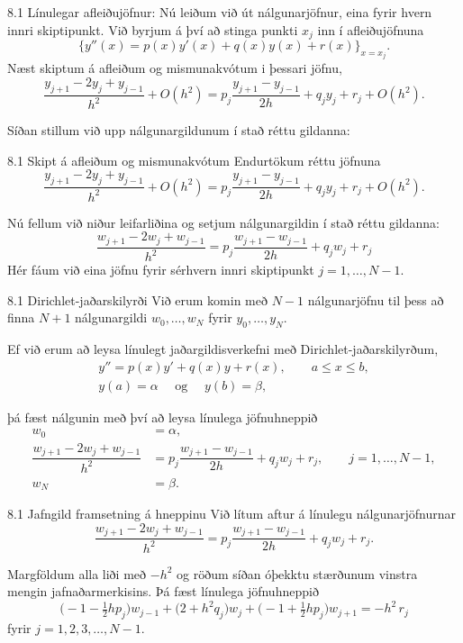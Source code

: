 \begin{frame}{8.1 Línulegar afleiðujöfnur:} 
Nú leiðum við út nálgunarjöfnur, eina fyrir hvern innri skiptipunkt.
Við byrjum á því að stinga punkti $x_j$ inn í afleiðujöfnuna
$$
\big\{ y''(x)= p(x)y'(x)+q(x)y(x) + r(x)\big\}_{x=x_j}.
$$
Næst skiptum á afleiðum og mismunakvótum i þessari jöfnu,
$$
\dfrac{y_{j+1}-2y_j+y_{j-1}}{h^2} +O(h^2)
=p_j\dfrac{y_{j+1}-y_{j-1}}{2h}+q_jy_j+r_j+ O(h^2).
$$

\pause
Síðan  stillum við upp nálgunargildunum  í stað réttu gildanna:
\end{frame}

\begin{frame}{8.1 Skipt á afleiðum og mismunakvótum} 
Endurtökum réttu jöfnuna
$$
\dfrac{y_{j+1}-2y_j+y_{j-1}}{h^2} +O(h^2)
=p_j\dfrac{y_{j+1}-y_{j-1}}{2h}+q_jy_j+r_j+ O(h^2).
$$

\pause
Nú fellum við niður leifarliðina og 
setjum nálgunargildin í stað réttu gildanna:
$$
\dfrac{w_{j+1}-2w_j+w_{j-1}}{h^2}
=p_j\dfrac{w_{j+1}-w_{j-1}}{2h}+q_jw_j+r_j
$$
Hér fáum við eina jöfnu fyrir sérhvern innri skiptipunkt
$j=1,\dots,N-1$.
\end{frame}


\begin{frame}{8.1 Dirichlet-jaðarskilyrði} 
Við erum komin með $N-1$ 
nálgunarjöfnu til þess að finna $N+1$
nálgunargildi $w_0,\dots,w_N$ fyrir $y_0,\dots,y_N$. 

\smallskip
Ef við erum að leysa línulegt jaðargildisverkefni með 
Dirichlet-jaðarskilyrðum,
  \begin{gather*}
    y''=p(x)y'+q(x)y+r(x), \qquad a\leq x\leq b,\\
y(a)=\alpha \quad \text{ og } \quad y(b)=\beta,
  \end{gather*}

\pause
þá fæst nálgunin með því að leysa línulega jöfnuhneppið
\begin{align*}
w_0&=\alpha,\\
\dfrac{w_{j+1}-2w_j+w_{j-1}}{h^2}
&=p_j\dfrac{w_{j+1}-w_{j-1}}{2h}+q_jw_j+r_j, \qquad j=1,\dots,N-1,\\
w_N&=\beta.  
\end{align*}
\end{frame}


\begin{frame}{8.1 Jafngild framsetning á hneppinu} 
Við lítum aftur á línulegu nálgunarjöfnurnar
$$
\dfrac{w_{j+1}-2w_j+w_{j-1}}{h^2}
=p_j\dfrac{w_{j+1}-w_{j-1}}{2h}+q_jw_j+r_j.
$$

\pause
Margföldum alla liði með $-h^2$ og röðum síðan óþekktu stærðunum
vinstra mengin jafnaðarmerkisins. Þá fæst línulega jöfnuhneppið
$$
\big(-1-\tfrac 12 h p_j\big)w_{j-1}
+\big(2+h^2q_j\big) w_j
+\big(-1+\tfrac 12 h p_j\big)w_{j+1}
=-h^2\, r_j
$$
fyrir $j=1,2,3,\dots,N-1$.
\end{frame}


